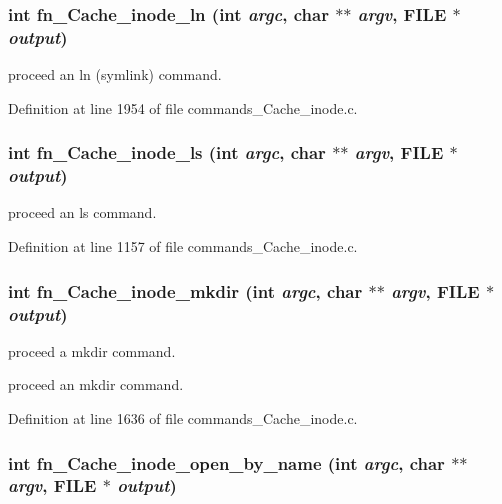 \subsubsection[{fn\_\-Cache\_\-inode\_\-ln}]{\setlength{\rightskip}{0pt plus 5cm}int fn\_\-Cache\_\-inode\_\-ln (int {\em argc}, \/  char $\ast$$\ast$ {\em argv}, \/  FILE $\ast$ {\em output})}\label{commands_8h_da1665ad0f6c599f444cecdfe3781260}


proceed an ln (symlink) command. 

Definition at line 1954 of file commands\_\-Cache\_\-inode.c.
\subsubsection[{fn\_\-Cache\_\-inode\_\-ls}]{\setlength{\rightskip}{0pt plus 5cm}int fn\_\-Cache\_\-inode\_\-ls (int {\em argc}, \/  char $\ast$$\ast$ {\em argv}, \/  FILE $\ast$ {\em output})}\label{commands_8h_2ba98a95ea4426bf580d55f4dacab3b7}


proceed an ls command. 

Definition at line 1157 of file commands\_\-Cache\_\-inode.c.
\subsubsection[{fn\_\-Cache\_\-inode\_\-mkdir}]{\setlength{\rightskip}{0pt plus 5cm}int fn\_\-Cache\_\-inode\_\-mkdir (int {\em argc}, \/  char $\ast$$\ast$ {\em argv}, \/  FILE $\ast$ {\em output})}\label{commands_8h_9230f34cda91d77f51bb32b5acf2b4ae}


proceed a mkdir command.

proceed an mkdir command. 

Definition at line 1636 of file commands\_\-Cache\_\-inode.c.
\subsubsection[{fn\_\-Cache\_\-inode\_\-open\_\-by\_\-name}]{\setlength{\rightskip}{0pt plus 5cm}int fn\_\-Cache\_\-inode\_\-open\_\-by\_\-name (int {\em argc}, \/  char $\ast$$\ast$ {\em argv}, \/  FILE $\ast$ {\em output})}\label{commands_8h_645198e6ac2e4e29a4df46b005b1c6eb}


